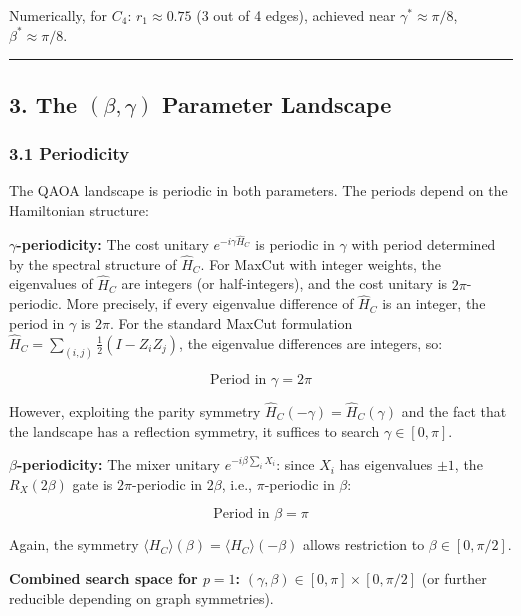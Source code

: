 \documentclass[
  11pt,
]{report}
\begin{document}
Numerically, for \(C_4\): \(r_1 \approx 0.75\) (3 out of 4 edges),
achieved near \(\gamma^* \approx \pi/8\), \(\beta^* \approx \pi/8\).

\begin{center}\rule{0.5\linewidth}{0.5pt}\end{center}

\subsection{\texorpdfstring{3. The \((\beta, \gamma)\) Parameter
Landscape}{3. The (\textbackslash beta, \textbackslash gamma) Parameter Landscape}}\label{the-beta-gamma-parameter-landscape}

\subsubsection{3.1 Periodicity}\label{periodicity}

The QAOA landscape is periodic in both parameters. The periods depend on
the Hamiltonian structure:

\textbf{\(\gamma\)-periodicity:} The cost unitary
\(e^{-i\gamma \hat{H}_C}\) is periodic in \(\gamma\) with period
determined by the spectral structure of \(\hat{H}_C\). For MaxCut with
integer weights, the eigenvalues of \(\hat{H}_C\) are integers (or
half-integers), and the cost unitary is \(2\pi\)-periodic. More
precisely, if every eigenvalue difference of \(\hat{H}_C\) is an
integer, the period in \(\gamma\) is \(2\pi\). For the standard MaxCut
formulation \(\hat{H}_C = \sum_{(i,j)} \frac{1}{2}(I - Z_iZ_j)\), the
eigenvalue differences are integers, so:

\[\text{Period in } \gamma = 2\pi\]

However, exploiting the parity symmetry
\(\hat{H}_C(-\gamma) = \hat{H}_C(\gamma)\) and the fact that the
landscape has a reflection symmetry, it suffices to search
\(\gamma \in [0, \pi]\).

\textbf{\(\beta\)-periodicity:} The mixer unitary
\(e^{-i\beta \sum_i X_i}\): since \(X_i\) has eigenvalues \(\pm 1\), the
\(R_X(2\beta)\) gate is \(2\pi\)-periodic in \(2\beta\), i.e.,
\(\pi\)-periodic in \(\beta\):

\[\text{Period in } \beta = \pi\]

Again, the symmetry
\(\langle H_C \rangle(\beta) = \langle H_C \rangle(-\beta)\) allows
restriction to \(\beta \in [0, \pi/2]\).

\textbf{Combined search space for \(p=1\):}
\((\gamma, \beta) \in [0, \pi] \times [0, \pi/2]\) (or further reducible
depending on graph symmetries).
\end{document}
